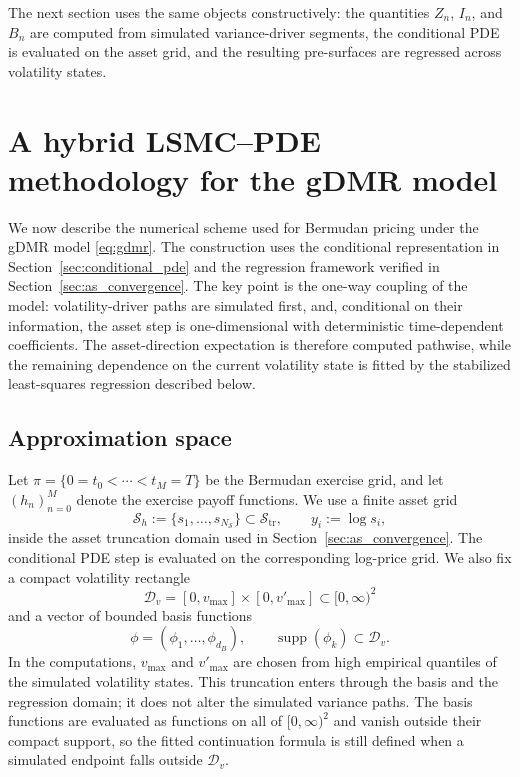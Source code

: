 \documentclass[10pt]{article}
\theoremstyle{plain}
\theoremstyle{definition}
\theoremstyle{remark}
\newcommand{\supp}{\operatorname{supp}}
\begin{document}
The next section uses the same objects constructively: the quantities $Z_n$, $I_n$, and $B_n$ are computed from
simulated variance-driver segments, the conditional PDE is evaluated on the asset grid, and the resulting
pre-surfaces are regressed across volatility states.




\section{A hybrid LSMC--PDE methodology for the gDMR model}
\label{sec:hybrid-method}

We now describe the numerical scheme used for Bermudan pricing under the gDMR model \eqref{eq:gdmr}. The construction uses the conditional representation in Section~\ref{sec:conditional_pde} and the regression framework verified in Section~\ref{sec:as_convergence}. The key point is the one-way coupling of the model: volatility-driver paths are simulated first, and, conditional on their information, the asset step is one-dimensional with deterministic time-dependent coefficients. The asset-direction expectation is therefore computed pathwise, while the remaining dependence on the current volatility state is fitted by the stabilized least-squares regression described below.

\subsection{Approximation space}
Let $\pi=\{0=t_0<\cdots<t_M=T\}$ be the Bermudan exercise grid, and let $(h_n)_{n=0}^M$ denote the exercise payoff functions. We use a finite asset grid
\[
\mathcal S_h := \{s_1,\dots,s_{N_{\mathcal S}}\}\subset \mathcal S_{\mathrm{tr}},
\qquad y_i:=\log s_i,
\]
inside the asset truncation domain used in Section~\ref{sec:as_convergence}. The conditional PDE step is evaluated on the corresponding log-price grid. We also fix a compact volatility rectangle
\[
\mathcal D_v=[0,v_{\max}]\times[0,v'_{\max}]\subset[0,\infty)^2
\]
and a vector of bounded basis functions
\[
\phi=(\phi_1,\dots,\phi_{d_B}),\qquad \supp(\phi_k)\subset \mathcal D_v.
\]
In the computations, $v_{\max}$ and $v'_{\max}$ are chosen from high empirical quantiles of the simulated volatility states. This truncation enters through the basis and the regression domain; it does not alter the simulated variance paths. The basis functions are evaluated as functions on all of $[0,\infty)^2$ and vanish outside their compact support, so the fitted continuation formula is still defined when a simulated endpoint falls outside $\mathcal D_v$.
\end{document}
